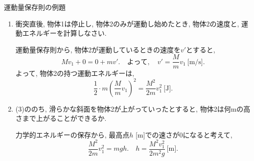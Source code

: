 \documentclass[11pt,dvipdfmx]{jsarticle}
\numberwithin{equation}{section} %
\begin{document}
\begin{exbox}{運動量保存則の例題}
\begin{enumerate}
    (1)より, あらい水平面に突入する際の初速度は$\frac{M}{M+m}v_{1}$ [m/s]です. 作用, 反作用の法則による力を$F$ [N]とします.
    \begin{itemize}
    \item 物体1について運動方程式を立てると, 
    \begin{itemize}
        \item 鉛直方向：$Mg - N_{1} = 0$. $N_{1}$は物体1の受ける垂直抗力.
        \item 水平方向：$-\mu N_{1} - F= Ma$. 進行方向を正とした.
    \end{itemize}
    \item 物体2について運動方程式を立てると, 
    \begin{itemize}
        \item 鉛直方向：$mg - N_{2} = 0$. $N_{2}$は物体2の受ける垂直抗力.
        \item 水平方向：$-\mu N_{2} + F= ma$. 進行方向を正とした.
    \end{itemize}
    \end{itemize}
    水平方向についての運動方程式を足し合わせれば$a = -\mu g$を得ます. 尚, 2つを質量$M + m$ [kg]の１つの物体と見なして運動方程式を立てれば同様の結論を得られます. 停止するときは速度が0になるため, \eqref{速度と位置の関係} 式より, 停止するまでに進む距離を$x$ [m]とすると(2つとも同じ距離だけ進みます),
    \begin{equation}
    0^2 - \left(\frac{M}{M+m}v_{1}\right)^2 = 2\cdot (-\mu g)x.\quad x = \frac{M^2v_{1}^2}{2\mu(M+m)^2g}\ \text{[m]}.
    \end{equation}
    \item 衝突直後, 物体1は停止し, 物体2のみが運動し始めたとき, 物体2の速度と, 運動エネルギーを計算しなさい.
    
    運動量保存則から, 物体2が運動しているときの速度を$v'$とすると,
    \begin{equation}
        Mv_{1} + 0 = 0+ mv'.\quad よって, \quad v' = \frac{M}{m}v_{1}\ \text{[m/s]}.
    \end{equation}
    よって, 物体2の持つ運動エネルギーは, 
    \begin{equation}
        \frac{1}{2}\cdot m \left(\frac{M}{m}v_{1}\right)^2 = \frac{M^2}{2m}v_{1}^2\ \text{[J]}.
    \end{equation}
    \item (3)ののち, 滑らかな斜面を物体2が上がっていったとすると, 物体2は何mの高さまで上がることができるか.
    
    力学的エネルギーの保存から, 最高点$h$ [m]での速さが0になると考えて, 
    \begin{equation}
        \frac{M^2}{2m}v_{1}^2 = mgh.\quad h = \frac{M^2v_{1}^2}{2m^2g}\ \text{[m]}.
    \end{equation}
\end{enumerate}
\end{exbox}
\end{document}

